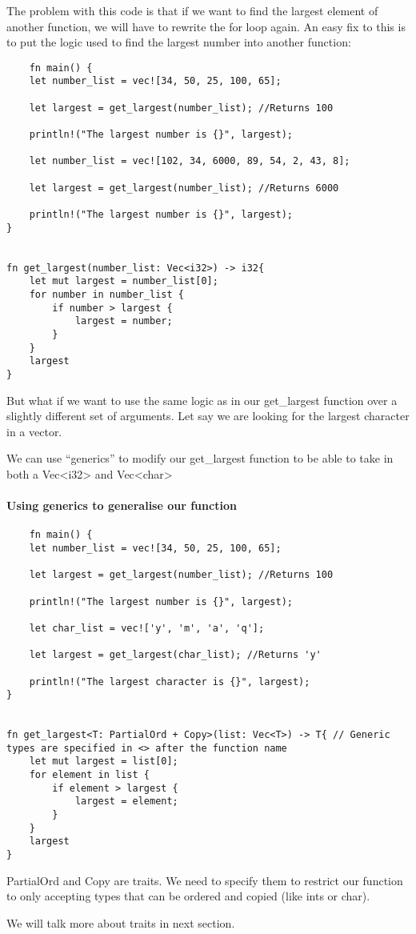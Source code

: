The problem with this code is that if we want to find the largest element of another function, we will have to rewrite the for loop again. An easy fix to this is to put the logic used to find the largest number into another function:
\newpage
\begin{lstlisting}
    fn main() {
    let number_list = vec![34, 50, 25, 100, 65];

    let largest = get_largest(number_list); //Returns 100

    println!("The largest number is {}", largest); 

    let number_list = vec![102, 34, 6000, 89, 54, 2, 43, 8];

    let largest = get_largest(number_list); //Returns 6000
    
    println!("The largest number is {}", largest); 
}


fn get_largest(number_list: Vec<i32>) -> i32{
    let mut largest = number_list[0];
    for number in number_list {
        if number > largest {
            largest = number;
        }
    }
    largest
}
\end{lstlisting}

But what if we want to use the same logic as in our get\_largest function over a slightly different set of arguments. Let say we are looking for the largest character in a vector.

We can use ``generics'' to modify our get\_largest function to be able to take in both a Vec<i32> and Vec<char>


\paragraph*{Using generics to generalise our function}
\begin{lstlisting}
    fn main() {
    let number_list = vec![34, 50, 25, 100, 65];

    let largest = get_largest(number_list); //Returns 100

    println!("The largest number is {}", largest);

    let char_list = vec!['y', 'm', 'a', 'q'];

    let largest = get_largest(char_list); //Returns 'y'
    
    println!("The largest character is {}", largest);
}


fn get_largest<T: PartialOrd + Copy>(list: Vec<T>) -> T{ // Generic types are specified in <> after the function name
    let mut largest = list[0];
    for element in list {
        if element > largest {
            largest = element;
        }
    }
    largest
}
\end{lstlisting}
\begin{remark}
    PartialOrd and Copy are traits. We need to specify them to restrict our function to only accepting types that can be ordered and copied (like ints or char).

    We will talk more about traits in next section.
\end{remark}

